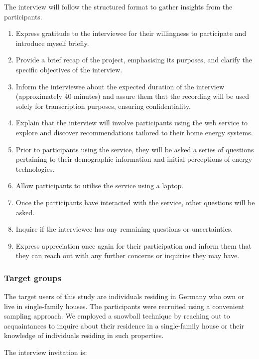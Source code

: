 The interview will follow the structured format to gather insights from the participants. 
\begin{enumerate}
  \item Express gratitude to the interviewee for their willingness to participate and introduce myself briefly.
  \item Provide a brief recap of the project, emphasising its purposes, and clarify the specific objectives of the interview.
  \item Inform the interviewee about the expected duration of the interview (approximately 40 minutes) and assure them that the recording will be used solely for transcription purposes, ensuring confidentiality.
  \item Explain that the interview will involve participants using the web service to explore and discover recommendations tailored to their home energy systems.
  \item Prior to participants using the service, they will be asked a series of questions pertaining to their demographic information and initial perceptions of energy technologies.
  \item Allow participants to utilise the service using a laptop.
  \item Once the participants have interacted with the service, other questions will be asked.
  \item Inquire if the interviewee has any remaining questions or uncertainties.
  \item Express appreciation once again for their participation and inform them that they can reach out with any further concerns or inquiries they may have.
\end{enumerate}


\subsubsection{Target groups}

The target users of this study are individuals residing in Germany who own or live in single-family houses.
The participants were recruited using a convenient sampling approach. 
We employed a snowball technique by reaching out to acquaintances to inquire about their residence in a single-family house or their knowledge of individuals residing in such properties. 

The interview invitation is:

